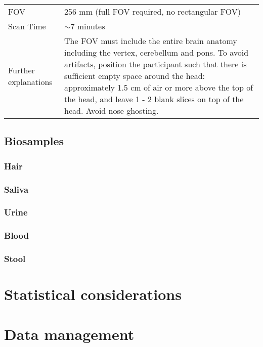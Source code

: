 \begin{table}[H]
\begin{tabularx}{\linewidth}{@{} s | X @{}}
FOV                       								& 256 mm (full FOV required, no rectangular FOV)                                            \\
Scan Time                 								& $\sim$7 minutes                                                                           \\
Further explanations      						&  The FOV must include the entire brain anatomy including the vertex, cerebellum and pons. To avoid artifacts, position the participant such that there is sufficient empty space around the head: approximately 1.5 cm of air or more above the top of the head, and leave 1 - 2 blank slices on top of the head. Avoid nose ghosting.                                                                                        
\end{tabularx}
\end{table}

\subsection{Biosamples}
\subsubsection{Hair}
\subsubsection{Saliva}
\subsubsection{Urine}
\subsubsection{Blood}
\subsubsection{Stool}

\section{Statistical considerations}


\section{Data management}

